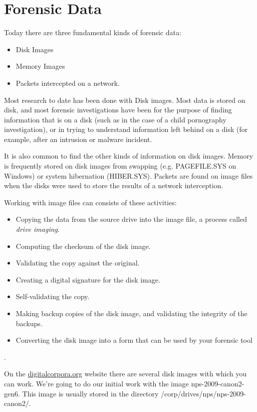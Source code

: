\documentclass{book}
\begin{document}
\chapter{Forensic Data}

Today there are three fundamental kinds of forensic data:

\begin{itemize}
\item Disk Images
\item Memory Images
\item Packets intercepted on a network.
\end{itemize}

Most research to date has been done with Disk images. Most data is
stored on disk, and most forensic investigations have been for the
purpose of finding information that is on a disk (such as in the case
of a child pornography investigation), or in trying to understand
information left behind on a disk (for example, after an intrusion or
malware incident.

It is also common to find the other kinds of information on disk
images. Memory is frequently stored on disk images from swapping
(e.g. PAGEFILE.SYS on Windows) or system hibernation
(HIBER.SYS). Packets are found on image files when the disks were used
to store the results of a network interception.

Working with image files can consists of these activities:


\begin{itemize}
\item Copying the data from the source drive into the image file, a
  process called \emph{drive imaging}.
\item Computing the checksum of the disk image.
\item Validating the copy against the original.
\item Creating a digital signature for the disk image.
\item Self-validating the copy.
\item Making backup copies of the disk image, and validating the integrity
  of the backups.
\item Converting the disk image into a form that can be used by your
  forensic tool
\end{itemize}.

On the \url{digitalcorpora.org} website there are several disk images with
which you can work. We're going to do our initial work with the image
nps-2009-canon2-gen6. This image is usually stored in the directory
/corp/drives/nps/nps-2009-canon2/.
\end{document}
